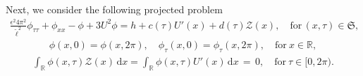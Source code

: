 \documentclass[10pt, reqno]{amsart}
\numberwithin{equation}{section}
\theoremstyle{definition}
\begin{document}
{{Next, we consider the following projected problem
\begin{align} \label{pro-linearphi1}
 \frac{\epsilon^2 4\pi^2}{{\tilde\ell}^2} \phi_{\tau\tau} + \phi_{xx} - \phi+3U^2 \phi = h+c(\tau) U'(x)+ d(\tau){\mathcal Z}(x),
 \quad \text{for}\,(x, \tau)\in \mathfrak S,
\end{align}
\begin{align}
 \phi(x, 0) = \phi(x, 2\pi), \quad \phi_\tau(x, 0) = \phi_\tau(x, 2\pi), \quad \text{for}~x\in {\mathbb R},
\end{align}
\begin{align} \label{pro-linearphi3}
 \int_{\mathbb R}\phi(x,\tau){\mathcal Z}(x) \,{\mathrm d}x = \int_{\mathbb R}\phi(x,\tau) U'(x)\,{\mathrm d}x \,=\, 0, \quad \text{for}~\tau\in [0, 2\pi).
\end{align}

}}
\end{document}
